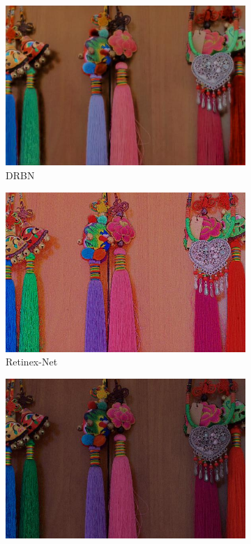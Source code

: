 \documentclass[a4paper, 10pt]{article}
\begin{document}
\begin{figure}[htb]
\begin{subfigure}{0.19\textwidth}
				\includegraphics[width=\linewidth]{picture/LLIE/Experiment/DRBN1}
				\captionsetup{font=scriptsize}
				\caption{DRBN}
				\label{fig: DRBN1}
			\end{subfigure}
			\begin{subfigure}{0.19\textwidth}
				\includegraphics[width=\linewidth]{picture/LLIE/Experiment/Retinex-Net1}
				\captionsetup{font=scriptsize}
				\caption{Retinex-Net}
				\label{fig: Retinex-Net1}
			\end{subfigure}
			\begin{subfigure}{0.19\textwidth}
				\includegraphics[width=\linewidth]{picture/LLIE/Experiment/RRDNet1}

\end{subfigure}
\end{figure}
\end{document}
